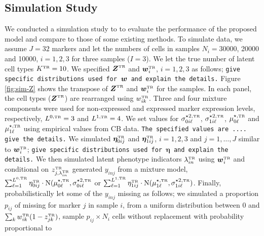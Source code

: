 \documentclass[12pt,]{article}
\newcommand{\N}{ \mathcal{N} }
\def\bet{\bm{\eta}}
\def\N{\text{N}}
\newcommand{\true}{{\mbox{\tiny TR}}}
\newcommand{\bZ}{\mbox{\boldmath $Z$}}
\newcommand{\bw}{\mbox{\boldmath $w$}}
\begin{document}
\subsection{Simulation Study} %
We conducted a simulation study to  to evaluate the performance of the proposed model and compare to those of some existing methods.
%
%
To simulate data, we assume $J=32$ markers and let the numbers of cells in samples $N_i=30000$, 20000 and 10000, $i=1, 2, 3$ for three samples ($I=3$).  We let the true number of latent cell types $K^\true=10$.  We specified $\bZ^\true$ and $\bw^\true_i$, $i=1,2,3$ as follows;
%
{\tt give specific distributions used for $\bw$ and explain the details.} 
%
Figure \ref{fig:sim-Z} shows the transpose of $\bZ^\true$ and $\bw^\true_i$ for the samples. In each panel, the cell types ($\bZ^\true$) are rearranged using $w_{ik}^\true$.  Three and four mixture components were used for non-expressed
and expressed marker expression levels, respectively, $L^{0, \true}=3$ and $L^{1, \true}=4$. We set values for $\sigma^{\star 2, \true}_{0i\ell}$,
$\sigma^{\star 2,\true}_{1i\ell}$, $\mu^{\star, \true}_{0\ell}$ and $\mu^{\star, \true}_{1\ell}$ using empirical values from CB data.
%
{\tt The specified values are .... give the details.}
%
 We simulated $\bet_{0ij}^\true$ and $\bet_{1ij}^\true$, $i=1,2,3$ and $j=1, \ldots, J$ similar to $\bw^\true_i$;
%
{\tt give specific distributions used for $\bet$ and explain the details.} 
%
 We then simulated latent phenotype indicators $\lambda_{in}^\true$ using $\bw_i^\true$ and conditional on $z^\true_{j,\lambda_{in}^\true}$ generated $y_{inj}$ from a mixture model, $\sum_{\ell=1}^{L^{0,\true}} \eta^\true_{0ij}\cdot\N(\mu^{\star, \true}_{0\ell}, \sigma^{\star 2, \true}_{0i\ell}$ or $\sum_{\ell=1}^{L^{1,\true}} \eta^\true_{1ij}\cdot\N(\mu^{\star, \true}_{1\ell}, \sigma^{\star 2, \true}_{1i\ell})$.   Finally, probabilistically let some of the $y_{inj}$ missing as follows; we simulated a proportion $p_{ij}$ of missing for marker $j$ in sample $i$, from a uniform distribution between 0 and  $\sum_k w^\true_{ik}(1-z^\true_{jk})$, sample $p_{ij}\times N_i$ cells  without replacement with probability proportional to
\end{document}

